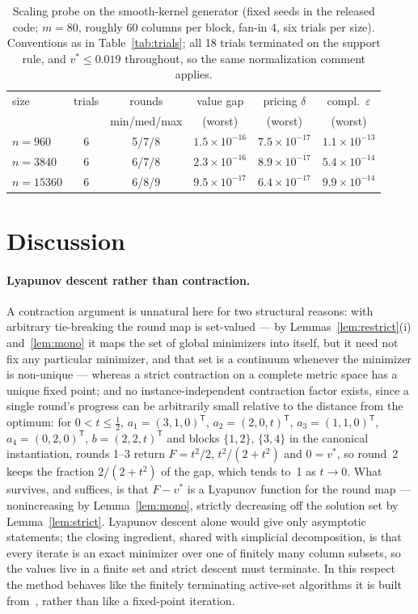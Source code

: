 \documentclass[pdflatex,sn-mathphys-num]{sn-jnl}
\theoremstyle{thmstyleone}
\theoremstyle{thmstyletwo}
\newcommand{\T}{{\mathsf T}}
\begin{document}
\begin{table}[t]
\centering
\caption{Scaling probe on the smooth-kernel generator (fixed seeds in
the released code; $m=80$, roughly 60 columns per block, fan-in 4, six
trials per size). Conventions as in Table~\ref{tab:trials}; all 18
trials terminated on the support rule, and $v^*\le0.019$ throughout,
so the same normalization comment applies.}
\label{tab:scaling}
\footnotesize
\setlength{\tabcolsep}{3pt}
\begin{tabular}{@{}lccccc@{}}
\toprule
size & trials & rounds & value gap & pricing $\delta$
& compl.\ $\varepsilon$\\
 & & min/med/max & (worst) & (worst) & (worst)\\
\midrule
$n=960$ & 6 & 5/7/8 & $1.5\times10^{-16}$ & $7.5\times10^{-17}$
& $1.1\times10^{-13}$\\
$n=3840$ & 6 & 6/7/8 & $2.3\times10^{-16}$ & $8.9\times10^{-17}$
& $5.4\times10^{-14}$\\
$n=15360$ & 6 & 6/8/9 & $9.5\times10^{-17}$ & $6.4\times10^{-17}$
& $9.9\times10^{-14}$\\
\bottomrule
\end{tabular}
\end{table}

\section{Discussion}\label{sec:discussion}

\paragraph{Lyapunov descent rather than contraction.}
A contraction argument is unnatural here for two structural reasons:
with arbitrary tie-breaking the round map is set-valued --- by
Lemmas~\ref{lem:restrict}(i) and~\ref{lem:mono} it maps the set of
global minimizers into itself, but it need not fix any particular
minimizer, and that set is a continuum whenever the minimizer is
non-unique --- whereas a strict
contraction on a complete metric space has a unique fixed point; and no
instance-independent contraction factor exists, since a single round's
progress can be arbitrarily small relative to the distance from the
optimum: for $0<t\le\tfrac12$, $a_1=(3,1,0)^{\T}$, $a_2=(2,0,t)^{\T}$,
$a_3=(1,1,0)^{\T}$, $a_4=(0,2,0)^{\T}$, $b=(2,2,t)^{\T}$ and blocks
$\{1,2\}$, $\{3,4\}$ in the canonical instantiation, rounds 1--3 return
$F=t^2/2$, $t^2/(2+t^2)$ and $0=v^*$, so round~2 keeps the fraction
$2/(2+t^2)$ of the gap, which tends to~1 as $t\to0$. What survives, and
suffices, is that $F-v^*$ is a Lyapunov function for the round map ---
nonincreasing by Lemma~\ref{lem:mono}, strictly decreasing off the
solution set by Lemma~\ref{lem:strict}. Lyapunov descent alone would
give only asymptotic statements; the closing ingredient, shared with
simplicial decomposition, is that every iterate is an exact minimizer over one of
finitely many column subsets, so the values live in a finite set and
strict descent must terminate. In this respect the method behaves like
the finitely terminating active-set algorithms it is built
from~\cite{lawson1974}, rather than like a fixed-point iteration.
\end{document}
